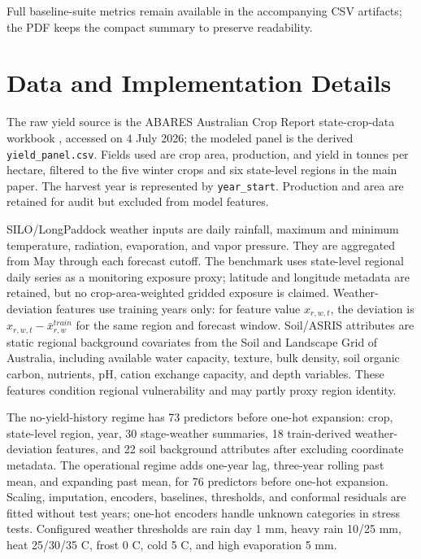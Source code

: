 \documentclass[wcp]{jmlr}
\begin{document}
Full baseline-suite metrics remain available in the accompanying CSV artifacts; the PDF keeps the compact summary to preserve readability.

\section{Data and Implementation Details}

The raw yield source is the ABARES Australian Crop Report state-crop-data workbook , accessed on 4 July 2026; the modeled panel is the derived \texttt{yield\_panel.csv}. Fields used are crop area, production, and yield in tonnes per hectare, filtered to the five winter crops and six state-level regions in the main paper. The harvest year is represented by \texttt{year\_start}. Production and area are retained for audit but excluded from model features.

SILO/LongPaddock weather inputs are daily rainfall, maximum and minimum temperature, radiation, evaporation, and vapor pressure. They are aggregated from May through each forecast cutoff. The benchmark uses state-level regional daily series as a monitoring exposure proxy; latitude and longitude metadata are retained, but no crop-area-weighted gridded exposure is claimed. Weather-deviation features use training years only: for feature value $x_{r,w,t}$, the deviation is $x_{r,w,t}-\bar{x}_{r,w}^{train}$ for the same region and forecast window. Soil/ASRIS attributes are static regional background covariates from the Soil and Landscape Grid of Australia, including available water capacity, texture, bulk density, soil organic carbon, nutrients, pH, cation exchange capacity, and depth variables. These features condition regional vulnerability and may partly proxy region identity.

The no-yield-history regime has 73 predictors before one-hot expansion: crop, state-level region, year, 30 stage-weather summaries, 18 train-derived weather-deviation features, and 22 soil background attributes after excluding coordinate metadata. The operational regime adds one-year lag, three-year rolling past mean, and expanding past mean, for 76 predictors before one-hot expansion. Scaling, imputation, encoders, baselines, thresholds, and conformal residuals are fitted without test years; one-hot encoders handle unknown categories in stress tests. Configured weather thresholds are rain day 1 mm, heavy rain 10/25 mm, heat 25/30/35 C, frost 0 C, cold 5 C, and high evaporation 5 mm.
\end{document}
